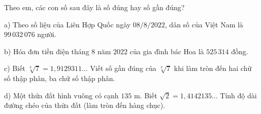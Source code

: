 \begin{ex}
Theo em, các con số sau đây là số đúng hay số gần đúng?

a) Theo số liệu của Liên Hợp Quốc ngày $08/8/2022$, dân số của Việt Nam là $99\,032\,076$ người.

b) Hóa đơn tiền điện tháng $8$ năm $2022$ của gia đình bác Hoa là $525\,314$ đồng.

c) Biết $\sqrt[3]{7}=1{,}9129311\ldots$ Viết số gần đúng của $\sqrt[3]{7}$ khi làm tròn đến hai chữ số thập phân, ba chữ số thập phân.

d) Một thửa đất hình vuông có cạnh $135$ m. Biết $\sqrt2=1{,}4142135\ldots$ Tính độ dài đường chéo của thửa đất (làm tròn đến hàng chục).
\end{ex}
